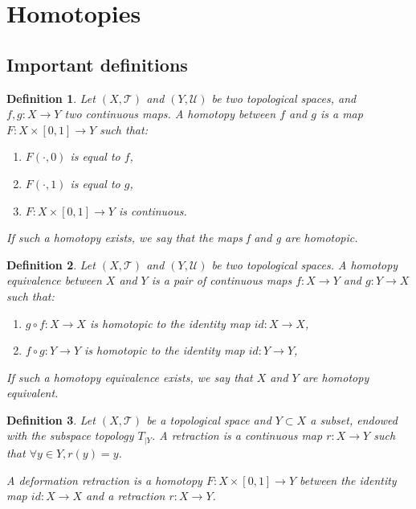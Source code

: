 \documentclass[a4paper,11pt]{article}
\theoremstyle{mytheor}
\newtheorem{definition}{Definition}[subsection]
\theoremstyle{mytheor}
\theoremstyle{remark}
\newcommand{\T}{\mathcal{T}}
\newcommand{\U}{\mathcal{U}}
\begin{document}
\section{Homotopies}

\subsection{Important definitions}

\begin{definition}
    Let $(X, \T)$ and $(Y, \U)$ be two topological spaces, and $f, g : X \to Y$
    two continuous maps. A homotopy between $f$ and $g$ is a map $F : X \times
    [0, 1] \to Y$ such that:
    \begin{enumerate}
        \item $F(\cdot, 0)$ is equal to $f$, 
        \item $F(\cdot, 1)$ is equal to $g$, 
        \item $F : X \times [0, 1] \to Y$ is continuous.
    \end{enumerate}
    If such a homotopy exists, we say that the maps f and g are homotopic.
\end{definition}
 
\begin{definition}
    Let $(X, \T)$ and $(Y, \U)$ be two topological spaces. A homotopy
    equivalence between $X$ and $Y$ is a pair of continuous maps $f : X \to Y$
    and $g : Y \to X$ such that:
    \begin{enumerate}
        \item $g \circ f : X \to X$ is homotopic to the identity map $id: X \to X$,
        \item $f \circ g : Y \to Y$ is homotopic to the identity map $id: Y \to Y$,
    \end{enumerate}
    If such a homotopy equivalence exists, we say that $X$ and $Y$ are homotopy equivalent.   
\end{definition}

\begin{definition}
    Let $(X, \T)$ be a topological space and $Y \subset X$ a subset, endowed
    with the subspace topology $T_{|Y}$. A retraction is a continuous map $r :
    X \to Y$ such that $\forall y \in Y, r(y) = y$. 
    
    A deformation retraction is a homotopy $F : X \times [0, 1] \to Y$ between
    the identity map $id: X \to X$ and a retraction $r : X \to Y$.
\end{definition}
\end{document}
